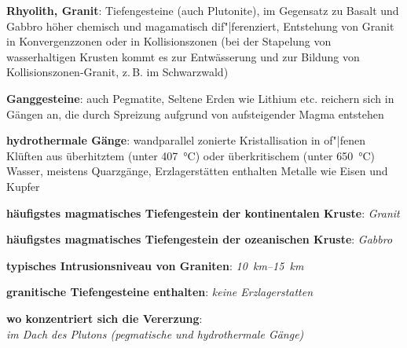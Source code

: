 \textbf{Rhyolith, Granit}:
Tiefengesteine (auch Plutonite),
im Gegensatz zu Basalt und Gabbro höher chemisch und magamatisch dif"|ferenziert,
Entstehung von Granit in Konvergenzzonen oder in Kollisionszonen
(bei der Stapelung von wasserhaltigen Krusten kommt es zur Entwässerung
und zur Bildung von Kollisionszonen-Granit, z.\,B. im Schwarzwald)

\textbf{Ganggesteine}:
auch Pegmatite,
Seltene Erden wie Lithium etc. reichern sich in Gängen an, die durch
Spreizung aufgrund von aufsteigender Magma entstehen

\textbf{hydrothermale Gänge}:
wandparallel zonierte Kristallisation in of"|fenen Klüften aus
überhitztem (unter \SI{407}{\celsius}) oder überkritischem (unter \SI{650}{\celsius}) Wasser,
meistens Quarzgänge,
Erzlagerstätten enthalten Metalle wie Eisen und Kupfer

\begin{wichtig}
    \item
    \textbf{häufigstes magmatisches Tiefengestein der kontinentalen Kruste}:
    \emph{Granit}

    \item
    \textbf{häufigstes magmatisches Tiefengestein der ozeanischen Kruste}:
    \emph{Gabbro}

    \item
    \textbf{typisches Intrusionsniveau von Graniten}:
    \emph{\SIrange[math-rm=\mathit,text-rm=\itshape]{10}{15}{\kilo\meter}}

    \item
    \textbf{granitische Tiefengesteine enthalten}:
    \emph{keine Erzlagerstatten}

    \item
    \textbf{wo konzentriert sich die Vererzung}:\\
    \emph{im Dach des Plutons (pegmatische und hydrothermale Gänge)}
\end{wichtig}

\pagebreak
